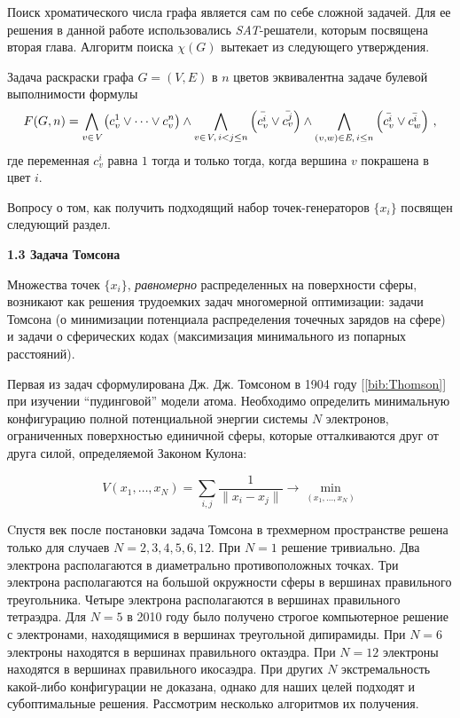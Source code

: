 Поиск хроматического числа графа является сам по себе сложной задачей. Для ее решения в данной работе использовались 
\textit{SAT}-решатели, которым посвящена вторая глава. Алгоритм поиска $\chi(G)$ вытекает из следующего утверждения.

\begin{statement1}\label{chapter1:formula}
Задача раскраски графа $G=(V,E)$ в $n$ цветов эквивалентна задаче булевой выполнимости формулы
$$F(G,n) = 
\bigwedge\limits_{v \in \textit{V}} 
\left( c_v^1 \vee \dots \vee c_v^n \right) 
\wedge 
\bigwedge\limits_{v \in \textit{V}, \, i < j \leq n } 
\left( \bar{c_v^i\vphantom{c_v^j}} \vee \bar{c_v^j} \right) 
\wedge 
\bigwedge\limits_{(v,w) \in \textit{E}, \, i \leq n} 
\left( \bar{c_v^i} \vee \bar{c_w^i} \right) \,,$$
где переменная $c_v^i$ равна $1$ тогда и только тогда, когда вершина $v$ покрашена в цвет $i$.
\end{statement1}

Вопросу о том, как получить подходящий набор точек-генераторов $\{ x_i \}$ посвящен следующий раздел.

\vspace{5pt}
\textbf{1.3 Задача Томсона}\label{chapters:1.3}
\vspace{5pt}

Множества точек $\{ x_i \}$, \textit{равномерно} распределенных на поверхности сферы, возникают как решения трудоемких задач многомерной оптимизации: задачи Томсона (о минимизации потенциала распределения точечных зарядов на сфере) и задачи о сферических кодах (максимизация минимального из попарных расстояний). 

Первая из задач сформулирована Дж. Дж. Томсоном в 1904 году [\ref{bib:Thomson}] при изучении \enquote{пудинговой} модели атома. 
Необходимо определить минимальную конфигурацию полной потенциальной энергии системы $N$ электронов, ограниченных поверхностью единичной сферы, которые отталкиваются друг от друга силой, определяемой Законом Кулона:

\begin{equation}\label{chapter1:thomson}
V(x_1, \dots, x_N) = \sum\limits_{i,j} \frac{1}{ \|x_i-x_j\| } \to \min\limits_{(x_1, \dots, x_N)}
\end{equation}

Cпустя век после постановки задача Томсона в трехмерном пространстве решена только для случаев 
$N = 2, 3, 4, 5, 6, 12$. 
При $N = 1$ решение тривиально. 
Два электрона располагаются в диаметрально противоположных точках.
Три электрона располагаются на большой окружности сферы в вершинах правильного треугольника.
Четыре электрона располагаются в вершинах правильного тетраэдра.
Для $N = 5$ в 2010 году было получено строгое компьютерное решение с электронами, находящимися в вершинах треугольной дипирамиды.
При $N = 6$ электроны находятся в вершинах правильного октаэдра.
При $N = 12$ электроны находятся в вершинах правильного икосаэдра.
При других $N$ экстремальность какой-либо конфигурации не доказана, 
однако для наших целей подходят и субоптимальные решения. Рассмотрим несколько алгоритмов их получения.

